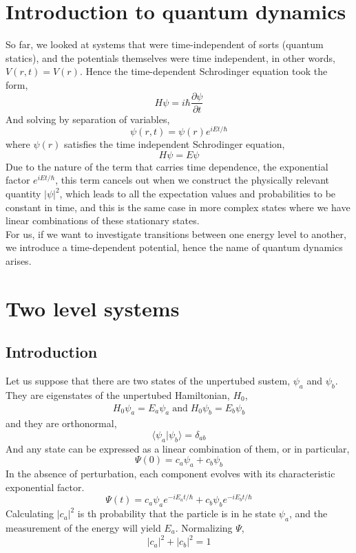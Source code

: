 \section{Introduction to quantum dynamics}
So far, we looked at systems that were time-independent of sorts (quantum statics), and the potentials themselves were time independent, in other words, $V(r,t)=V(r)$. Hence the time-dependent Schrodinger equation took the form,
\begin{equation}
	H\psi=i\hbar\frac{\partial \psi}{\partial t}
\end{equation}
And solving by separation of variables,
\begin{equation}
	\psi(r,t)=\psi(r)e^{iEt/\hbar}
\end{equation}
where $\psi(r)$ satisfies the time independent Schrodinger equation,
\begin{equation}
	H\psi=E\psi
\end{equation}
Due to the nature of the term that carries time dependence, the exponential factor $e^{iEt/\hbar}$, this term cancels out when we construct the physically relevant quantity $|\psi|^2$, which leads to all the expectation values and probabilities to be constant in time, and this is the same case in more complex states where we have linear combinations of these stationary states.\\
For us, if we want to investigate transitions between one energy level to another, we introduce a time-dependent potential, hence the name of quantum dynamics arises.

\section{Two level systems}
\subsection{Introduction}
Let us suppose that there are two states of the unpertubed sustem, $\psi_a$ and $\psi_b$. They are eigenstates of the unpertubed Hamiltonian, $H_0$,
\begin{align}
	H_0\psi_a=E_a  \psi_a \; \text{and} \; H_0\psi_b=E_b\psi_b
\end{align}
and they are orthonormal,
\begin{equation}
	\langle\psi_a|\psi_b\rangle=\delta_{ab}
\end{equation}
And any state can be expressed as a linear combination of them, or in particular,
\begin{equation}
	\Psi(0)=c_a\psi_a+c_b\psi_b
\end{equation}
In the absence of perturbation, each component evolves with its characteristic exponential factor.
\begin{equation}
	\Psi(t)=c_a\psi_ae^{-iE_at/\hbar}+c_b\psi_be^{-iE_bt/\hbar}
\end{equation}
Calculating $|c_a|^2$ is th probability that the particle is in he state $\psi_a$, and the measurement of the energy will yield $E_a$. Normalizing $\Psi$,
\begin{equation}
	|c_a|^2+|c_b|^2=1
\end{equation}


